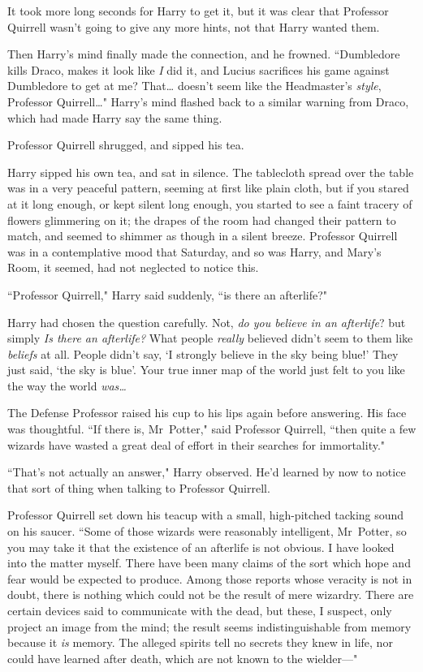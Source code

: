 It took more long seconds for Harry to get it, but it was clear that Professor Quirrell wasn't going to give any more hints, not that Harry wanted them.

Then Harry's mind finally made the connection, and he frowned. ``Dumbledore kills Draco, makes it look like \emph{I} did it, and Lucius sacrifices his game against Dumbledore to get at me? That{\ldots} doesn't seem like the Headmaster's \emph{style}, Professor Quirrell{\ldots}" Harry's mind flashed back to a similar warning from Draco, which had made Harry say the same thing.

Professor Quirrell shrugged, and sipped his tea.

Harry sipped his own tea, and sat in silence. The tablecloth spread over the table was in a very peaceful pattern, seeming at first like plain cloth, but if you stared at it long enough, or kept silent long enough, you started to see a faint tracery of flowers glimmering on it; the drapes of the room had changed their pattern to match, and seemed to shimmer as though in a silent breeze. Professor Quirrell was in a contemplative mood that Saturday, and so was Harry, and Mary's Room, it seemed, had not neglected to notice this.

``Professor Quirrell," Harry said suddenly, ``is there an afterlife?"

Harry had chosen the question carefully. Not, \emph{do you believe in an afterlife}? but simply \emph{Is there an afterlife?} What people \emph{really} believed didn't seem to them like \emph{beliefs} at all. People didn't say, `I strongly believe in the sky being blue!' They just said, `the sky is blue'. Your true inner map of the world just felt to you like the way the world \emph{was{\ldots}}

The Defense Professor raised his cup to his lips again before answering. His face was thoughtful. ``If there is, Mr~Potter," said Professor Quirrell, ``then quite a few wizards have wasted a great deal of effort in their searches for immortality."

``That's not actually an answer," Harry observed. He'd learned by now to notice that sort of thing when talking to Professor Quirrell.

Professor Quirrell set down his teacup with a small, high-pitched tacking sound on his saucer. ``Some of those wizards were reasonably intelligent, Mr~Potter, so you may take it that the existence of an afterlife is not obvious. I have looked into the matter myself. There have been many claims of the sort which hope and fear would be expected to produce. Among those reports whose veracity is not in doubt, there is nothing which could not be the result of mere wizardry. There are certain devices said to communicate with the dead, but these, I suspect, only project an image from the mind; the result seems indistinguishable from memory because it \emph{is} memory. The alleged spirits tell no secrets they knew in life, nor could have learned after death, which are not known to the wielder—"

